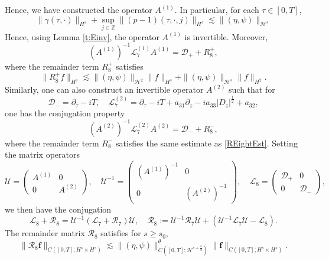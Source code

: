 \documentclass[12pt]{amsart}
\theoremstyle{remark}
\theoremstyle{definition}
\numberwithin{equation}{section}
\newcommand{\p}{\partial}
\newcommand{\Z}{\mathbb{Z}}
\renewcommand{\H}{{\mathcal H }}
\newcommand{\f}{\frac}
\newcommand{\mD}{\mathcal{D}}
\newcommand{\mL}{\mathcal{L}}
\newcommand{\mR}{\mathcal{R}}
\newcommand{\mU}{\mathcal{U}}
\begin{document}
Hence, we have constructed the operator $A^{(1)}$.
In particular, for each $\tau\in [0,T]$, 
\begin{equation} \label{PhaseEstimate}
 \|\gamma(\tau, \cdot)\|_{H^{s}} + \sup_{j \in \Z}\|(p-1)(\tau, \cdot, j) \|_{H^{s}} \lesssim \|(\eta,\psi)\|_{\H^s}
\end{equation}
Hence, using Lemma \ref{t:Einv}, the operator $A^{(1)}$ is invertible.
Moreover, 
\begin{equation*}
(A^{(1)})^{-1} \mL_7^{(1)}A^{(1)} = \mD_+ + R_{8}^+, 
\end{equation*}
where the remainder term $R_{8}^+$ satisfies 
\begin{equation} \label{REightEst}
 \|R_{8}^+ f \|_{H^s} \lesssim \|(\eta, \psi)\|_{\H^2} \|f\|_{H^s} + \|(\eta, \psi)\|_{\H^{s}} \|f\|_{H^2}.
\end{equation}
Similarly, one can also construct an invertible operator $A^{(2)}$ such that for 
\begin{equation*}
 \mD_- = \p_\tau - iT, \quad  \mL_7^{(2)} = \p_\tau -iT+a_{31}\p_z -ia_{33}|D_z|^\f12+ a_{32},   
\end{equation*}
one has the conjugation property 
\begin{equation*}
(A^{(2)})^{-1} \mL_7^{(2)}A^{(2)} = \mD_- + R_{8}^-, 
\end{equation*}
where the remainder term $R_{8}^-$ satisfies the same estimate as \eqref{REightEst}.
Setting the matrix operators
\begin{equation} \label{UDef}
\mathcal{U} =  \begin{pmatrix}
 A^{(1)}    & 0 \\ 
0 &  A^{(2)}
\end{pmatrix}, \quad \mathcal{U}^{-1} =  \begin{pmatrix}
  (A^{(1)})^{-1}    & 0 \\ 
0 &   (A^{(2)})^{-1}
\end{pmatrix}, \quad \mL_8 =  \begin{pmatrix}
  \mD_+    & 0 \\ 
0 &   \mD_-
\end{pmatrix},
\end{equation}
we then have the conjugation
\begin{equation} \label{mL78Conjugation}
 \mL_8 + \mR_8 = \mU^{-1}(\mL_7 +\mR_7)\mU, \quad \mR_8 := \mU^{-1}\mR_7\mU + (\mU^{-1}\mL_7 \mU- \mL_8).
\end{equation}
The remainder matrix $\mR_8$ satisfies for $s \geq s_0$,
\begin{equation} \label{mREightEst}
 \|\mR_8 \mathbf{f} \|_{C([0,T];H^{s}\times H^s)} \lesssim \|(\eta, \psi)\|^\theta_{C([0,T];\H^{s+\f52})} \|\mathbf{f}\|_{C([0,T];H^{s}\times H^s)}.
\end{equation}
\end{document}

